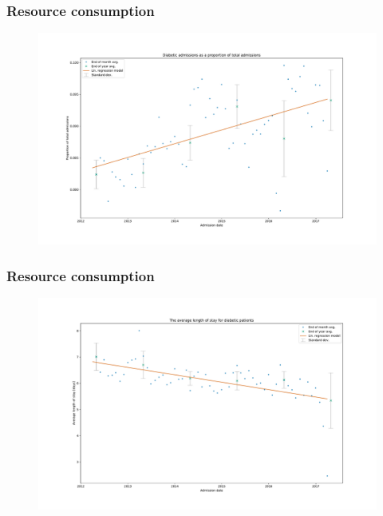 \documentclass{beamer}
\begin{document}
\begin{frame}
    \frametitle{Resource consumption}

    \begin{figure}
        \includegraphics[width=\linewidth]{./img/diabetic_admissions.pdf}
    \end{figure}
\end{frame}

\begin{frame}
    \frametitle{Resource consumption}

    \begin{figure}
        \includegraphics[width=\linewidth]{./img/diabetic_LOS_time.pdf}
    \end{figure}
\end{frame}
\end{document}
